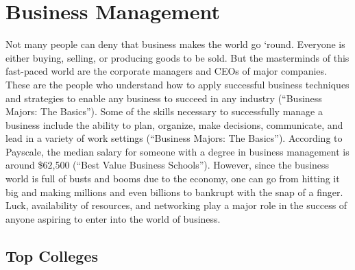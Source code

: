 \chapter{Business Management}
\begin{multicols}{2}

Not many people can deny that business makes the world go ‘round. Everyone is either buying, selling, or producing goods to be sold. But the masterminds of this fast-paced world are the corporate managers and CEOs of major companies. These are the people who understand how to apply successful business techniques and strategies to enable any business to succeed in any industry (“Business Majors: The Basics”). Some of the skills necessary to successfully manage a business include the ability to plan, organize, make decisions, communicate, and lead in a variety of work settings (“Business Majors: The Basics”). According to Payscale, the median salary for someone with a degree in business management is around \$62,500 (“Best Value Business Schools”). However, since the business world is full of busts and booms due to the economy, one can go from hitting it big and making millions and even billions to bankrupt with the snap of a finger. Luck, availability of resources, and networking play a major role in the success of anyone aspiring to enter into the world of business. 

\end{multicols}

\section{Top Colleges}

\begin{table}[H]
\centering
\caption{Undergraduate Colleges}
\label{Buisness Management Undergraduate Colleges}
\end{table}

